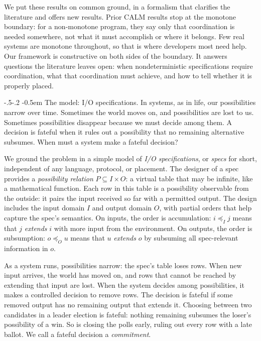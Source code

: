 \documentclass[sigconf]{cidr-2027}
\makeatletter
\theoremstyle{remark}
\renewcommand\paragraph{\@startsection{paragraph}{4}{\z@}%
  {-.5\baselineskip \@plus -2\p@ \@minus -.2\p@}%
  {-0.5em}%
  {\normalfont\bfseries}}
\newcommand{\InputOrd}{\preceq_I}
\newcommand{\OutputOrd}{\preceq_O}
\newcommand{\commitment}{commitment\xspace}
\newcommand{\inrel}{extends\xspace}          %
\newcommand{\outrel}{extends\xspace}          %
\newcommand{\spectype}[1][]{I/O specification#1\xspace}
\newcommand{\Spectype}[1][]{I/O specification#1\xspace}
\makeatother
\begin{document}
We put these results on common ground, in a formalism that clarifies the
literature and offers new results.  Prior CALM results stop at the monotone
boundary: for a non-monotone program, they say only that coordination is needed
somewhere, not what it must accomplish or where it belongs.  Few real systems
are monotone throughout, so that is where developers most need help.  Our
framework is constructive on both sides of the boundary.  It answers questions
the literature leaves open: when nondeterministic specifications require
coordination, what that coordination must achieve, and how to tell whether it is
properly placed.

\paragraph{The model: \Spectype[s].}
In systems, as in life, our possibilities narrow over time. Sometimes the world
moves on, and possibilities are lost to us. Sometimes possibilities disappear
because we must decide among them. A
decision is fateful when it rules out a possibility that no remaining alternative
subsumes. When must a system make a fateful decision?

We ground the problem in a simple model of \emph{\spectype[s]}, or \emph{specs}
for short, independent of any language, protocol, or placement. The designer of
a spec provides a \emph{possibility relation} $P\subseteq I\times O$: a virtual
table that may be infinite, like a mathematical function. Each row in this table
is a possibility observable from the outside: it pairs the input received so far
with a permitted output. The design includes the input domain $I$ and output domain $O$,
with partial orders that help capture the spec's semantics.  On inputs, the order
is accumulation: $i\InputOrd j$ means that $j$ \emph{\inrel} $i$ with more input
from the environment.  On outputs, the order is subsumption: $o\OutputOrd u$
means that  $u$ \emph{\outrel} $o$ by subsuming all spec-relevant information in
$o$.

As a system runs, possibilities narrow: the spec's table loses rows.  When new
input arrives, the world has moved on, and rows that cannot be reached by
extending that input are lost.  When the system decides among possibilities, it
makes a controlled decision to remove rows.  The decision is fateful if some
removed output has no remaining output that \outrel it.
Choosing between two candidates in a leader election is fateful: nothing
remaining subsumes the loser's possibility of a win.  So is closing the polls early,
ruling out every row with a late ballot.  We call a fateful decision a
\emph{\commitment}.
\end{document}
